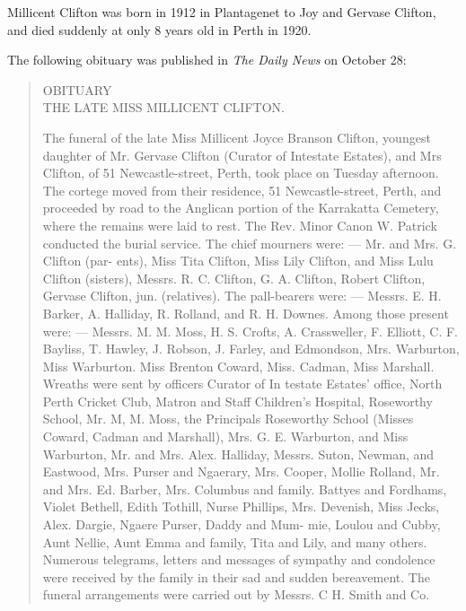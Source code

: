 
Millicent Clifton was born in 1912 in Plantagenet\cite{MJBCbirth} to Joy and Gervase Clifton, and died suddenly at only 8 years old in Perth in 1920.\cite{MJBCdeath}

The following obituary was published in \emph{The Daily News} on October 28:

\begin{quotation}
OBITUARY \\
THE LATE MISS MILLICENT CLIFTON.

The funeral of the late Miss Millicent Joyce Branson Clifton, youngest daughter of Mr. Gervase Clifton (Curator of Intestate Estates), and Mrs Clifton, of 51 Newcastle-street, Perth, took place on Tuesday afternoon. The cortege moved from their residence, 51 Newcastle-street, Perth, and proceeded by road to the Anglican portion of the Karrakatta Cemetery, where the remains were laid to rest. The Rev. Minor Canon W. Patrick conducted the burial service. The chief mourners were: — Mr. and Mrs. G. Clifton (par- ents), Miss Tita Clifton, Miss Lily Clifton, and Miss Lulu Clifton (sisters), Messrs. R. C. Clifton, G. A. Clifton, Robert Clifton, Gervase Clifton, jun. (relatives). The pall-bearers were: — Messrs. E. H. Barker, A. Halliday, R. Rolland, and R. H. Downes. Among those present were: — Messrs. M. M. Moss, H. S. Crofts, A. Crassweller, F. Elliott, C. F. Bayliss, T. Hawley, J. Robson, J. Farley, and Edmondson, Mrs. Warburton, Miss Warburton. Miss Brenton Coward, Miss. Cadman, Miss Marshall. Wreaths were sent by officers Curator of In testate Estates' office, North Perth Cricket Club, Matron and Staff Children's Hospital, Roseworthy School, Mr. M, M. Moss, the Principals Roseworthy School (Misses Coward, Cadman and Marshall), Mrs. G. E. Warburton, and Miss Warburton, Mr. and Mrs. Alex. Halliday, Messrs. Suton, Newman, and Eastwood, Mrs. Purser and Ngaerary, Mrs. Cooper, Mollie Rolland, Mr. and Mrs. Ed. Barber, Mrs. Columbus and family. Battyes and Fordhams, Violet Bethell, Edith Tothill, Nurse Phillips, Mrs. Devenish, Miss Jecks, Alex. Dargie, Ngaere Purser, Daddy and Mum- mie, Loulou and Cubby, Aunt Nellie, Aunt Emma and family, Tita and Lily, and many others. Numerous telegrams, letters and messages of sympathy and condolence were received by the family in their sad and sudden bereavement. The funeral arrangements were carried out by Messrs. C H. Smith and Co.
\end{quotation}
